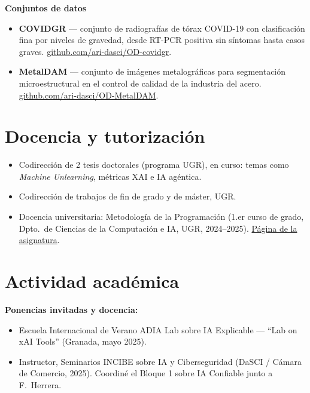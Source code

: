 \documentclass[10pt,a4paper]{article}
\newcommand{\blueitem}[1]{\textcolor{subtitleblue}{\textbf{#1}}}
\begin{document}
\blueitem{Conjuntos de datos}
\begin{itemize}
    \item \textbf{COVIDGR} --- conjunto de radiografías de tórax COVID-19 con clasificación fina por niveles de gravedad, desde RT-PCR positiva sin síntomas hasta casos graves. \href{https://github.com/ari-dasci/OD-covidgr}{github.com/ari-dasci/OD-covidgr}.
    \item \textbf{MetalDAM} --- conjunto de imágenes metalográficas para segmentación microestructural en el control de calidad de la industria del acero. \href{https://github.com/ari-dasci/OD-MetalDAM}{github.com/ari-dasci/OD-MetalDAM}.
\end{itemize}

\section*{Docencia y tutorización}

\begin{itemize}
    \item Codirección de 2 tesis doctorales (programa UGR), en curso: temas como \textit{Machine Unlearning}, métricas XAI e IA agéntica.
    \item Codirección de trabajos de fin de grado y de máster, UGR.
    \item Docencia universitaria: Metodología de la Programación (1.er curso de grado, Dpto.~de Ciencias de la Computación e IA, UGR, 2024--2025). \href{https://grados.ugr.es/ramas/ingenieria-arquitectura/grado-ingenieria-informatica/metodologia-la-programacion}{Página de la asignatura}.
\end{itemize}

\section*{Actividad académica}

\blueitem{Ponencias invitadas y docencia:}
\begin{itemize}
    \item Escuela Internacional de Verano ADIA Lab sobre IA Explicable --- ``Lab on xAI Tools'' (Granada, mayo 2025).
    \item Instructor, Seminarios INCIBE sobre IA y Ciberseguridad (DaSCI / Cámara de Comercio, 2025). Coordiné el Bloque 1 sobre IA Confiable junto a F.~Herrera.
\end{itemize}
\end{document}
